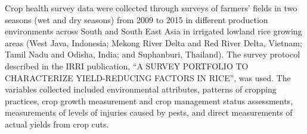 

Crop health survey data were collected through surveys of farmers' fields in two seasons (wet and dry seasons) from 2009 to 2015 in different production environments across South and South East Asia in irrigated lowland rice growing areas (West Java, Indonesia; Mekong River Delta and Red River Delta, Vietnam; Tamil Nadu and Odisha, India; and Suphanburi, Thailand). The survey protocol described in the IRRI publication, ``A SURVEY PORTFOLIO TO CHARACTERIZE YIELD-REDUCING FACTORS IN RICE'',  was used. The variables collected included environmental attributes, patterns of cropping practices, crop growth measurement and crop management status assessments, measurements of levels of injuries caused by pests, and direct measurements of actual yields from crop cuts. 



